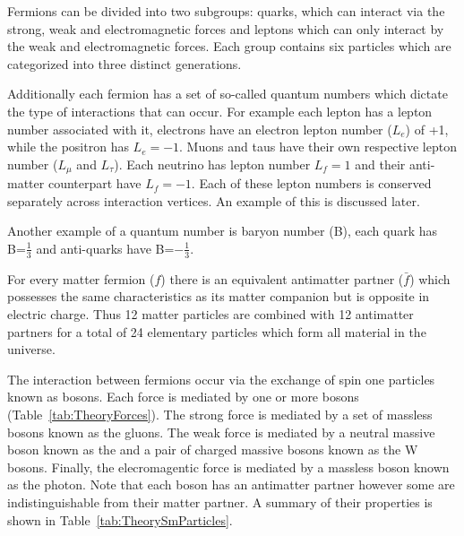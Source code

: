 Fermions can be divided into two subgroups: quarks, which can interact via the strong, weak and electromagnetic forces and leptons which can only interact by the weak and electromagnetic forces. Each group contains six particles which are categorized into three distinct generations.

Additionally each fermion has a set of so-called quantum numbers which dictate the type of interactions that can occur. For example each lepton has a lepton number associated with it, electrons have an electron lepton number ($L_e$) of +1, while the positron has $L_e=-1$. Muons and taus have their own respective lepton number ($L_{\mu}$ and $L_{\tau}$). Each neutrino has lepton number $L_{f}=1$ and their anti-matter counterpart have $L_f=-1$. Each of these lepton numbers is conserved separately across interaction vertices. An example of this is discussed later.

Another example of a quantum number is baryon number (B), each quark has B=$\frac{1}{3}$ and anti-quarks have B=$-\frac{1}{3}$.

For every matter fermion ($f$) there is an equivalent antimatter partner ($\bar{f}$) which possesses the same characteristics as its matter companion but is opposite in electric charge. Thus 12 matter particles are combined with 12 antimatter partners for a total of 24 elementary particles which form all material in the universe.

The interaction between fermions occur via the exchange of spin one particles known as bosons. Each force is mediated by one or more bosons (Table~\ref{tab:TheoryForces}). The strong force is mediated by a set of massless bosons known as the gluons. The weak force is mediated by a neutral massive boson known as the \ZbosonText{} and a pair of charged massive bosons known as the W bosons. Finally, the elecromagentic force is mediated by a massless boson known as the photon. Note that each boson has an antimatter partner however some are indistinguishable from their matter partner. A summary of their properties is shown in Table~\ref{tab:TheorySmParticles}.

